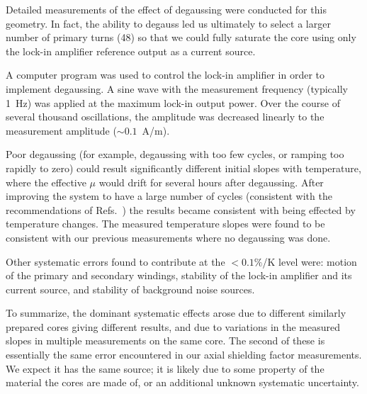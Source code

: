 Detailed measurements of the effect of degaussing were conducted for
this geometry.  In fact, the ability to degauss led us ultimately to
select a larger number of primary turns (48) so that we could fully
saturate the core using only the lock-in amplifier reference output as
a current source.

A computer program was used to control the lock-in amplifier in order
to implement degaussing.  A sine wave with the measurement frequency
(typically 1~Hz) was applied at the maximum lock-in output power.
Over the course of several thousand oscillations, the amplitude was
decreased linearly to the measurement amplitude ($\sim 0.1$~A/m).

Poor degaussing (for example, degaussing with too few cycles, or
ramping too rapidly to zero) could result significantly different
initial slopes with temperature, where the effective $\mu$ would drift
for several hours after degaussing.  After improving the system to
have a large number of cycles (consistent with the recommendations of
Refs.~\cite{bib:thiel,bib:altarev2015}) the results became consistent
with being effected by temperature changes.  The measured temperature
slopes were found to be consistent with our previous measurements
where no degaussing was done.

Other systematic errors found to contribute at the $<0.1\%$/K level
were: motion of the primary and secondary windings, stability of the
lock-in amplifier and its current source, and stability of background
noise sources.

To summarize, the dominant systematic effects arose due to different
similarly prepared cores giving different results, and due to
variations in the measured slopes in multiple measurements on the same
core.  The second of these is essentially the same error encountered
in our axial shielding factor measurements.  We expect it has the same
source; it is likely due to some property of the material the cores
are made of, or an additional unknown systematic uncertainty.
